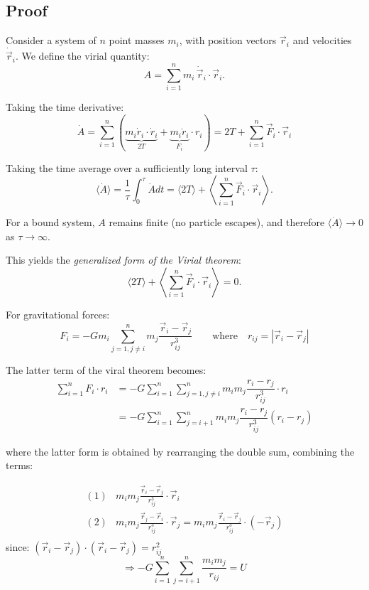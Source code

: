 \subsection{Proof}
Consider a system of $n$ point masses $m_i$, with position vectors $\vec r_i$ and velocities $\dot{\vec r}_i$. We define the virial quantity:
$$
A = \sum_{i=1}^n m_i \, \dot{\vec r}_i \cdot \vec r_i.
$$

Taking the time derivative:
$$
\dot A = \sum_{i=1}^n (\underbrace{m_i \dot r_i \cdot \dot r_i}_{2T} + \underbrace{m_i \ddot r_i}_{F_i} \cdot r_i)
= 2T + \sum_{i=1}^n \vec F_i \cdot \vec r_i
$$

Taking the time average over a sufficiently long interval $\tau$:
$$
\langle \dot A \rangle = \dfrac 1\tau \int_0^\tau \dot A dt =\langle 2T \rangle + \left\langle \sum_{i=1}^n \vec F_i \cdot \vec r_i \right\rangle.
$$

For a bound system, $A$ remains finite (no particle escapes), and therefore $\langle \dot A \rangle \to 0$ as $\tau \to \infty$. 

This yields the \textit{generalized form of the Virial theorem}:
$$
\langle 2T \rangle + \left\langle \sum_{i=1}^n \vec F_i \cdot \vec r_i \right\rangle = 0.
$$

For gravitational forces:
$$
F_i = -G m_i \sum_{j=1, j\neq i}^n m_j \frac{\vec{r}_i - \vec{r}_j}{r_{ij}^3} \qquad \text{where} \quad r_{ij} = |\vec{r}_i - \vec{r}_j|
$$

The latter term of the viral theorem becomes:
$$
\begin{array}{rl}
\sum_{i=1}^n F_i \cdot r_i 
& \displaystyle = -G \sum_{i=1}^n \sum_{j = 1, j \neq i}^n m_i m_j \dfrac {r_i - r_j}{r_{ij}^3} \cdot r_i\\
& \displaystyle = -G \sum_{i=1}^n \sum_{j = i + 1}^n m_i m_j \dfrac {r_i - r_j}{r_{ij}^3} (r_i - r_j)
\end{array}
$$

where the latter form is obtained by rearranging the double sum, combining the terms:

$$
\begin{array}{rl}
(1) & \displaystyle m_i m_j \frac{\vec{r}_i - \vec{r}_j}{r_{ij}^3} \cdot \vec{r}_i\\
(2) & \displaystyle m_i m_j \frac{\vec{r}_j - \vec{r}_i}{r_{ij}^3} \cdot \vec{r}_j = m_i m_j \frac{\vec{r}_i - \vec{r}_j}{r_{ij}^3} \cdot (-\vec{r}_j)\\
\end{array}
$$
since: $(\vec{r}_i - \vec{r}_j) \cdot (\vec{r}_i - \vec{r}_j) = r_{ij}^2$
$$
\Rightarrow -G \sum_{i=1}^n \sum_{j=i+1}^n \frac{m_i m_j}{r_{ij}} = U
$$

